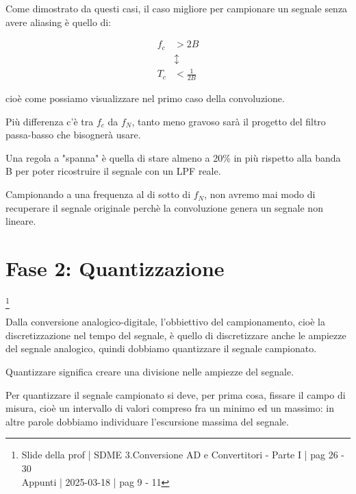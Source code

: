 Come dimostrato da questi casi, 
il caso migliore per campionare un segnale senza avere aliasing è quello di: 

{
    \Large 
    \begin{equation}
        \begin{split}
            f_c &> 2B
            \\ 
            &\updownarrow
            \\ 
            T_c &< \frac{1}{2B}
        \end{split} 
    \end{equation}
}

cioè come possiamo visualizzare nel primo caso della convoluzione. \newline 

Più differenza c'è tra $f_c$ da $f_N$, tanto meno gravoso sarà il progetto del filtro passa-basso che bisognerà usare. \newline 

Una regola a "spanna" è quella di stare almeno a 20\% in più rispetto alla banda B per poter ricostruire il segnale 
con un LPF reale. \newline 

Campionando a una frequenza al di sotto di $f_N$, non avremo mai modo di recuperare il segnale originale perchè la convoluzione genera un segnale non lineare. \newline 

\newpage 

\section{Fase 2: Quantizzazione}
\footnote{Slide della prof | SDME 3.Conversione AD e Convertitori - Parte I | pag 26 - 30 \\  
Appunti | 2025-03-18 | pag 9 - 11}

Dalla conversione analogico-digitale, l'obbiettivo del campionamento, cioè la discretizzazione nel tempo del segnale, 
è quello di discretizzare anche le ampiezze del segnale analogico, quindi dobbiamo quantizzare il segnale campionato. \newline 

Quantizzare significa creare una divisione nelle ampiezze del segnale. \newline 

Per quantizzare il segnale campionato si deve, per prima cosa, fissare il campo di misura, 
cioè un intervallo di valori compreso fra un minimo ed un massimo: 
in altre parole dobbiamo individuare l'escursione massima del segnale. \newline 

